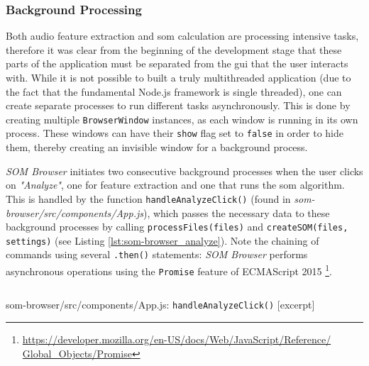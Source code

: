 \subsubsection{Background Processing}
\label{subsubsec:som-browser_background_processing}
Both audio feature extraction and \gls{som} calculation are processing intensive
tasks, therefore it was clear from the beginning of the development stage that
these parts of the application must be separated from the \gls{gui} that the
user interacts with. While it is not possible to built a truly multithreaded
application (due to the fact that the fundamental Node.js framework is single
threaded), one can create separate processes to run different tasks
asynchronously. This is done by creating multiple \texttt{BrowserWindow}
instances, as each window is running in its own process. These windows can have
their \texttt{show} flag set to \texttt{false} in order to hide
them, thereby creating an invisible window for a background process.

\smallskip

\textit{SOM Browser} initiates two consecutive background processes when the
user clicks on \textit{"Analyze"}, one for feature extraction and one that runs
the \gls{som} algorithm. This is handled by the function
\texttt{handleAnalyzeClick()} (found in
\textit{som-browser/src/components/App.js}), which passes the necessary data to
these background processes by calling \texttt{processFiles(files)} and
\texttt{createSOM(files, settings)} (see Listing
\ref{lst:som-browser_analyze}). Note the chaining of commands using several
\texttt{.then()} statements: \textit{SOM Browser} performs asynchronous
operations using the \texttt{Promise} feature of ECMAScript 2015
\footnote{\href{https://developer.mozilla.org/en-US/docs/Web/JavaScript/Reference/Global\_Objects/Promise}
{https://developer.mozilla.org/en-US/docs/Web/JavaScript/Reference/ \\
Global\_Objects/Promise}}.

\begin{listing}[!htb]
  \begin{mdframed}
    \inputminted[breaklines, numbers=left, firstline=284, lastline=293,
    fontsize=\footnotesize]{jsx}{../dev/som-browser/src/components/App.js}
  \end{mdframed}
  \caption{som-browser/src/components/App.js:
  \texttt{handleAnalyzeClick()} [excerpt]}
  \label{lst:som-browser_analyze}
\end{listing}

